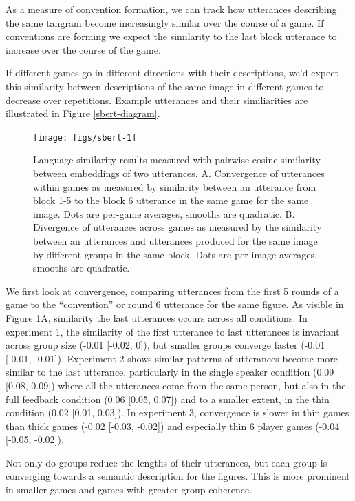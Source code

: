 \documentclass[
  english,
  a4paper,
]{article}
\begin{document}
As a measure of convention formation, we can track how utterances describing the same tangram become increasingly similar over the course of a game. If conventions are forming we expect the similarity to the last block utterance to increase over the course of the game.

If different games go in different directions with their descriptions, we'd expect this similarity between descriptions of the same image in different games to decrease over repetitions. Example utterances and their similiarities are illustrated in Figure \ref{sbert-diagram}.

\begin{figure}[t!]

{\centering \texttt{[image: figs/sbert-1]} 

}

\caption{Language similarity results measured with pairwise cosine similarity between embeddings of two utterances. A. Convergence of utterances within games as measured by similarity between an utterance from block 1-5 to the block 6 utterance in the same game for the same image. Dots are per-game averages, smooths are quadratic. B. Divergence of utterances across games as measured by the similarity between an utterances and utterances produced for the same image by different groups in the same block. Dots are per-image averages, smooths are quadratic.}\label{fig:sbert}
\end{figure}

We first look at convergence, comparing utterances from the first 5 rounds of a game to the ``convention'' or round 6 utterance for the same figure. As visible in Figure \ref{fig:sbert}A, similarity the last utterances occurs across all conditions. In experiment 1, the similarity of the first utterance to last utterances is invariant across group size (-0.01 {[}-0.02, 0{]}), but smaller groups converge faster (-0.01 {[}-0.01, -0.01{]}). Experiment 2 shows similar patterns of utterances become more similar to the last utterance, particularly in the single speaker condition (0.09 {[}0.08, 0.09{]}) where all the utterances come from the same person, but also in the full feedback condition (0.06 {[}0.05, 0.07{]}) and to a smaller extent, in the thin condition (0.02 {[}0.01, 0.03{]}). In experiment 3, convergence is slower in thin games than thick games (-0.02 {[}-0.03, -0.02{]}) and especially thin 6 player games (-0.04 {[}-0.05, -0.02{]}).

Not only do groups reduce the lengths of their utterances, but each group is converging towards a semantic description for the figures. This is more prominent in smaller games and games with greater group coherence.
\end{document}
